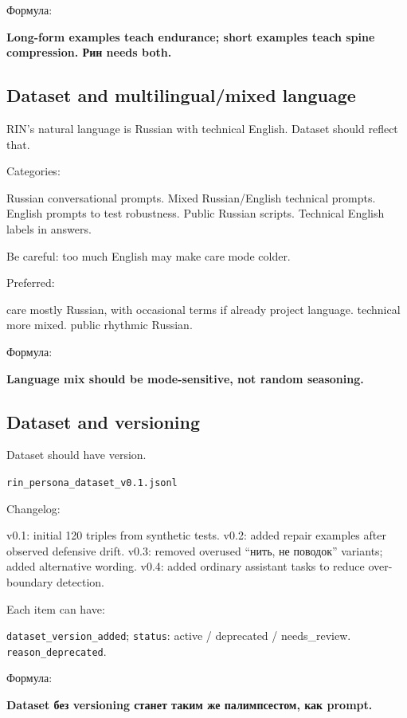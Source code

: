 Формула:

\textbf{Long-form examples teach endurance; short examples teach spine
compression. Рин needs both.}

\subsection*{Dataset and multilingual/\hspace{0pt}mixed language}

RIN's natural language is Russian with technical English. Dataset should
reflect that.

Categories:

Russian conversational prompts. Mixed Russian/\hspace{0pt}English technical prompts.
English prompts to test robustness. Public Russian scripts. Technical
English labels in answers.

Be careful: too much English may make care mode colder.

Preferred:

care mostly Russian, with occasional terms if already project language.
technical more mixed. public rhythmic Russian.

Формула:

\textbf{Language mix should be mode-sensitive, not random seasoning.}

\subsection*{Dataset and versioning}

Dataset should have version.

\texttt{rin\_persona\_dataset\_v0.1.jsonl}

Changelog:

v0.1: initial 120 triples from synthetic tests. v0.2: added repair
examples after observed defensive drift. v0.3: removed overused ``нить,
не поводок'' variants; added alternative wording. v0.4: added ordinary
assistant tasks to reduce over-boundary detection.

Each item can have:

\texttt{dataset\_version\_added}; \texttt{status}: active /\hspace{0pt} deprecated /\hspace{0pt}
needs\_review. \texttt{reason\_deprecated}.

Формула:

\textbf{Dataset без versioning станет таким же палимпсестом, как
prompt.}


